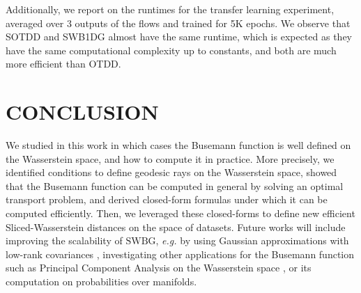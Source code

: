\documentclass[twoside]{article}
\newcommand{\swbg}{\mathrm{SWBG}}
\begin{document}
Additionally, we report on  the runtimes for the transfer learning experiment, averaged over 3 outputs of the flows and trained for 5K epochs. We observe that SOTDD and SWB1DG almost have the same runtime, which is expected as they have the same computational complexity up to constants, and both are much more efficient than OTDD.


\section{CONCLUSION}

 We studied in this work in which cases the Busemann function is well defined on the Wasserstein space, and how to compute it in practice. More precisely, we identified conditions to  define geodesic rays on the Wasserstein space, showed that the Busemann function can be computed in general by solving an optimal transport problem, and derived closed-form formulas under which it can be computed efficiently. Then, we leveraged these closed-forms to define new efficient Sliced-Wasserstein distances on the space of datasets. Future works will include improving the scalability of $\swbg$, \emph{e.g.} by using Gaussian approximations with low-rank covariances \citep{bouveyron2025scaling}, investigating other applications for the Busemann function such as Principal Component Analysis on the Wasserstein space \citep{cazelles2018geodesic, vesseron2025wasserstein}, or its computation on probabilities over manifolds.

\begin{table}[t]
    \caption{Runtime in seconds for the transfer learning experiment from MNIST to Fashion MNIST.} %
    \label{tab:runtime_tf}
    \centering
\end{table}
\end{document}
